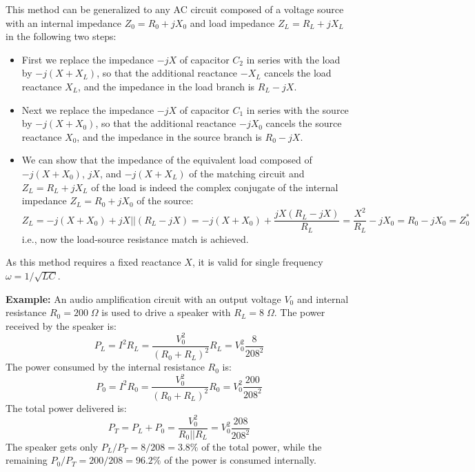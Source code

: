 \documentclass{article}
\begin{document}
This method can be generalized to any AC circuit composed of a voltage 
source with an internal impedance $Z_0=R_0+jX_0$ and load impedance 
$Z_L=R_L+jX_L$ in the following two steps:
\begin{itemize}
\item First we replace the impedance $-jX$ of capacitor $C_2$ in series 
  with the load by $-j(X+X_L)$, so that the additional reactance $-X_L$ 
  cancels the load reactance $X_L$, and the impedance in the load branch
  is $R_L-jX$.
\item Next we replace the impedance $-jX$ of capacitor $C_1$ in series 
  with the source by $-j(X+X_0)$, so that the additional reactance $-jX_0$
  cancels the source reactance $X_0$, and the impedance in the source
  branch is $R_0-jX$.
\item We can show that the impedance of the equivalent load composed 
  of $-j(X+X_0)$, $jX$, and $-j(X+X_L)$ of the matching circuit and 
  $Z_L=R_L+jX_L$ of the load is indeed the complex conjugate of the
  internal impedance $Z_L=R_0+jX_0$ of the source:
  \begin{equation} 
    Z_L=-j(X+X_0)+jX || (R_L-jX)=-j(X+X_0)+\frac{jX(R_L-jX)}{R_L}
    =\frac{X^2}{R_L}-jX_0=R_0-jX_0 =Z^*_0 
  \end{equation}
  i.e., now the load-source resistance match is achieved. 
\end{itemize}

As this method requires a fixed reactance $X$, it is valid for single
frequency $\omega=1/\sqrt{LC}$.

{\bf Example:} An audio amplification circuit with an output voltage $V_0$
and internal resistance $R_0=200\;\Omega$ is used to drive a speaker with 
$R_L=8\;\Omega$. 
The power received by the speaker is:
\begin{equation} 
  P_L=I^2R_L=\frac{V_0^2}{(R_0+R_L)^2}R_L=V_0^2\frac{8}{208^2} 
\end{equation}
The power consumed by the internal resistance $R_0$ is:
\begin{equation}
  P_0=I^2R_0=\frac{V_0^2}{(R_0+R_L)^2}R_0=V_0^2\frac{200}{208^2} 
\end{equation}
The total power delivered is:
\begin{equation}
  P_T=P_L+P_0=\frac{V_0^2}{R_0 || R_L} =V_0^2\frac{208}{208^2} 
\end{equation}
The speaker gets only $P_L/P_T=8/208=3.8\%$ of the total power, while the 
remaining $P_0/P_T=200/208=96.2\%$ of the power is consumed internally. 
\end{document}
